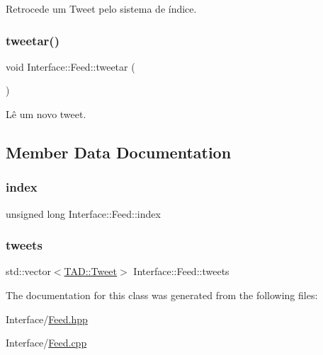 Retrocede um Tweet pelo sistema de índice. 

\mbox{\label{class_interface_1_1_feed_a38ef9424e64953f3f526df972f3452a7}} 
\subsubsection{\texorpdfstring{tweetar()}{tweetar()}}
{\footnotesize\ttfamily void Interface\+::\+Feed\+::tweetar (\begin{DoxyParamCaption}{ }\end{DoxyParamCaption})\hspace{0.3cm}{\ttfamily [private]}}



Lê um novo tweet. 



\subsection{Member Data Documentation}
\mbox{\label{class_interface_1_1_feed_ac9bb88831516af18069557d6e3d8c03c}} 
\subsubsection{\texorpdfstring{index}{index}}
{\footnotesize\ttfamily unsigned long Interface\+::\+Feed\+::index\hspace{0.3cm}{\ttfamily [private]}}

\mbox{\label{class_interface_1_1_feed_a50d506d437402c19a1b1b8319639b7cf}} 
\subsubsection{\texorpdfstring{tweets}{tweets}}
{\footnotesize\ttfamily std\+::vector$<$\hyperlink{class_t_a_d_1_1_tweet}{T\+A\+D\+::\+Tweet}$>$ Interface\+::\+Feed\+::tweets\hspace{0.3cm}{\ttfamily [private]}}



The documentation for this class was generated from the following files\+:\begin{DoxyCompactItemize}
\item 
Interface/\hyperlink{_feed_8hpp}{Feed.\+hpp}\item 
Interface/\hyperlink{_feed_8cpp}{Feed.\+cpp}\end{DoxyCompactItemize}
